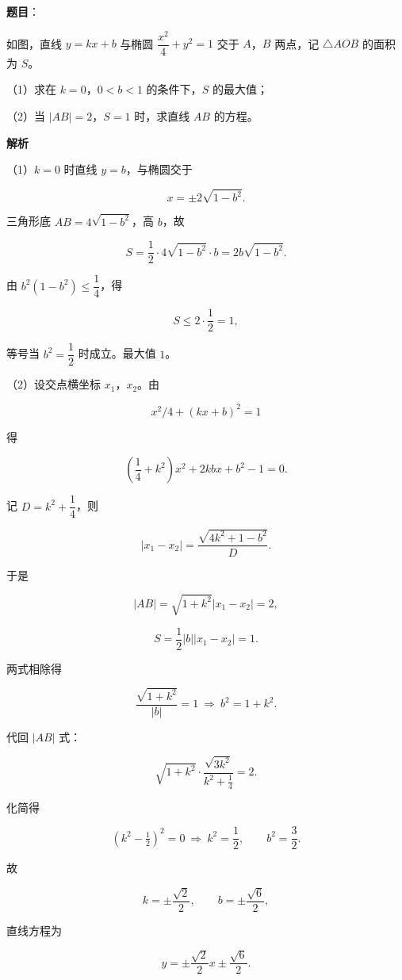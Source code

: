 \begin{answer}

\textbf{题目}：

如图，直线 $y=kx+b$ 与椭圆 $\dfrac{x^2}{4}+y^2=1$ 交于 $A$，$B$ 两点，记 $\triangle AOB$ 的面积为 $S$。

（1）求在 $k=0$，$0<b<1$ 的条件下，$S$ 的最大值；

（2）当 $|AB|=2$，$S=1$ 时，求直线 $AB$ 的方程。
\nopagebreak[4]
\begin{center}\end{center}
\nopagebreak[4]
\textbf{解析}

（1）$k=0$ 时直线 $y=b$，与椭圆交于

\nopagebreak[4]
\[x=\pm2\sqrt{1-b^2}.\]

三角形底 $AB=4\sqrt{1-b^2}$，高 $b$，故

\nopagebreak[4]
\[S=\frac12\cdot4\sqrt{1-b^2}\cdot b=2b\sqrt{1-b^2}.\]

由 $b^2(1-b^2)\leqslant\dfrac14$，得

\nopagebreak[4]
\[S\leqslant2\cdot\frac12=1,\]

等号当 $b^2=\dfrac12$ 时成立。最大值 $1$。

（2）设交点横坐标 $x_1$，$x_2$。由

\nopagebreak[4]
\[x^2/4+(kx+b)^2=1\]

得

\nopagebreak[4]
\[\left(\frac14+k^2\right)x^2+2kbx+b^2-1=0.\]

记 $D=k^2+\dfrac14$，则

\nopagebreak[4]
\[|x_1-x_2|=\frac{\sqrt{4k^2+1-b^2}}{D}.\]

于是

\nopagebreak[4]
\[|AB|=\sqrt{1+k^2}|x_1-x_2|=2,\]

\nopagebreak[4]
\[S=\frac12|b||x_1-x_2|=1.\]

两式相除得

\nopagebreak[4]
\[\frac{\sqrt{1+k^2}}{|b|}=1\ \Rightarrow\ b^2=1+k^2.\]

代回 $|AB|$ 式：

\nopagebreak[4]
\[\sqrt{1+k^2}\cdot\frac{\sqrt{3k^2}}{k^2+\frac14}=2.\]

化简得

\nopagebreak[4]
\[(k^2-\tfrac12)^2=0\ \Rightarrow\ k^2=\frac12,\qquad b^2=\frac32.\]

故

\nopagebreak[4]
\[k=\pm\frac{\sqrt2}{2},\qquad b=\pm\frac{\sqrt6}{2},\]

直线方程为

\nopagebreak[4]
\[y=\pm\frac{\sqrt2}{2}x\pm\frac{\sqrt6}{2}.\]


\end{answer}